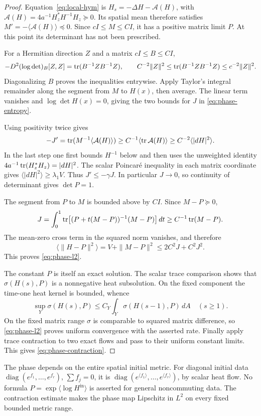 \begin{proof}
Equation~\eqref{eq:local-hym} is
$H_s=-\Delta H-\mathcal A(H)$, with
$\mathcal A(H)=4a^{-1}H_z^*H^{-1}H_z\succeq0$.
Its spatial mean therefore satisfies
$M'=-\langle\mathcal A(H)\rangle\preceq0$.
Since $cI\le M\le CI$, it has a positive matrix
limit $P$. At this point its determinant has
not been prescribed.

For a Hermitian direction $Z$ and a matrix
$cI\le B\le CI$,
\[
 -D^2(\log\det)_B[Z,Z]
 =\operatorname{tr}(B^{-1}ZB^{-1}Z),\qquad
 C^{-2}\|Z\|^2\le\operatorname{tr}(B^{-1}ZB^{-1}Z)
                  \le c^{-2}\|Z\|^2.
\]
Diagonalizing $B$ proves the inequalities
entrywise. Apply Taylor's integral remainder
along the segment from $M$ to $H(x)$, then
average. The linear term vanishes and
$\log\det H(x)=0$, giving the two bounds
for $J$ in \eqref{eq:phase-entropy}.

Using positivity twice gives
\[
 -J'=\operatorname{tr}(M^{-1}\langle\mathcal A(H)\rangle)
 \ge C^{-1}\langle\operatorname{tr}\mathcal A(H)\rangle
 \ge C^{-2}\langle|dH|^2\rangle.
\]
In the last step one first bounds $H^{-1}$
below and then uses the unweighted identity
$4a^{-1}\operatorname{tr}(H_z^*H_z)=|dH|^2$. The scalar
Poincar\'e inequality in each matrix coordinate
gives $\langle|dH|^2\rangle\ge\lambda_1V$.
Thus $J'\le-\gamma J$. In particular
$J\to0$, so continuity of determinant gives
$\det P=1$.

The segment from $P$ to $M$ is bounded above
by $CI$. Since $M-P\succeq0$,
\[
 J=\int_0^1\operatorname{tr}\!\left[
 (P+t(M-P))^{-1}(M-P)\right]dt
 \ge C^{-1}\operatorname{tr}(M-P).
\]
The mean-zero cross term in the squared norm
vanishes, and therefore
\[
 \langle\|H-P\|^2\rangle
 =V+\|M-P\|^2\le2C^2J+C^2J^2.
\]
This proves \eqref{eq:phase-l2}.

The constant $P$ is itself an exact solution.
The scalar trace comparison shows that
$\sigma(H(s),P)$ is a nonnegative heat
subsolution. On the fixed component the
time-one heat kernel is bounded, whence
\[
 \sup_Y\sigma(H(s),P)
 \le C_Y\int_Y\sigma(H(s-1),P)\,dA
 \quad(s\ge1).
\]
On the fixed matrix range $\sigma$ is
comparable to squared matrix difference,
so \eqref{eq:phase-l2} proves uniform
convergence with the asserted rate.
Finally apply trace contraction to two
exact flows and pass to their uniform
constant limits. This gives
\eqref{eq:phase-contraction}.
\end{proof}

The phase depends on the entire spatial initial
metric. For diagonal initial data
$\operatorname{diag}(e^{f_1},\ldots,e^{f_r})$,
$\sum f_j=0$, it is
$\operatorname{diag}(e^{\langle f_1\rangle},
\ldots,e^{\langle f_r\rangle})$, by scalar
heat flow. No formula
$P=\exp\langle\log H^{\mathrm{in}}\rangle$
is asserted for general noncommuting data.
The contraction estimate makes the phase map
Lipschitz in $L^2$ on every fixed bounded
metric range.


